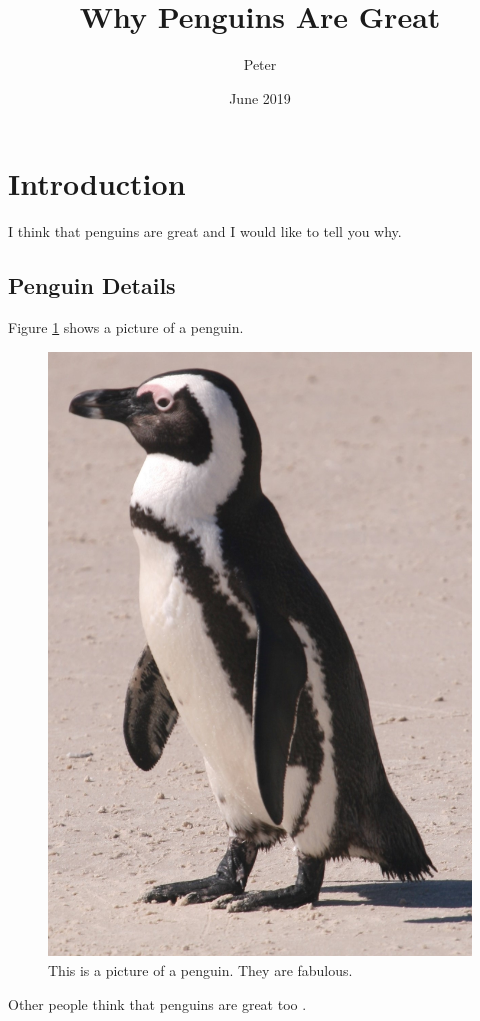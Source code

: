 \documentclass{article}
\title{Why Penguins Are Great}
\author{Peter}
\date{June 2019}
\begin{document}
\maketitle

\section{Introduction}

I think that penguins are great and I would like to tell you why.

\subsection{Penguin Details}

Figure \ref{fig:penguin} shows a picture of a penguin. 
\begin{figure}[h!]
	\centering
	\includegraphics[scale=0.15]{figures/penguin}
	\caption{This is a picture of a penguin. They are fabulous.}
	\label{fig:penguin}
\end{figure}

Other people think that penguins are great too \cite{Mattern2018}.




\end{document}
